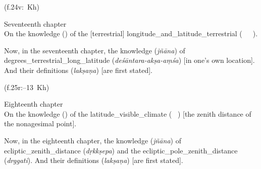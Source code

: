 
\begin{multicols}{2}
\noindent\reversemarginpar{}%
\columnbreak

\noindent\normalmarginpar{}%
\enskip
(f.\thinspace 24v:~Kh)
\end{multicols}%
%
\begin{multicols}{2}
Seventeenth chapter\\
On the \gls{knowledge} (\marifat) of the [terrestrial] \gls{longitude_and_latitude_terrestrial} (\tul\ \va\ \ard\idafaconsonant\ \balad).
\columnbreak

Now, in the seventeenth chapter, the \gls{knowledge} (\textit{jñāna}) of \gls{degrees_terrestrial_long_latitude} (\textit{deśāntara-akṣa-aṃśa}) [in one's own location]. And their \glspl{definition} (\textit{lakṣaṇa}) [are first stated]. 
\end{multicols}

\newpage %


\begin{multicols}{2}
\noindent\reversemarginpar{}%
\columnbreak

\noindent\normalmarginpar{}%
\enskip
(f.\thinspace 25r:--13~Kh)
\end{multicols}%
%
\begin{multicols}{2}
Eighteenth chapter\\
On the \gls{knowledge} (\marifat) of the \gls{latitude_visible_climate}  (\mbox{\ard\idafaconsonant\ \iqlim\idafaconsonant} \ruyat) [\ie the zenith distance of the nonagesimal point].
\columnbreak

Now, in the eighteenth chapter, the \gls{knowledge} (\textit{jñāna}) of \gls{ecliptic_zenith_distance} (\textit{dṛkkṣepa}) and the \gls{ecliptic_pole_zenith_distance} (\textit{drggati}). And their \glspl{definition} (\textit{lakṣaṇa}) [are first stated]. 
\end{multicols}
\medskip

